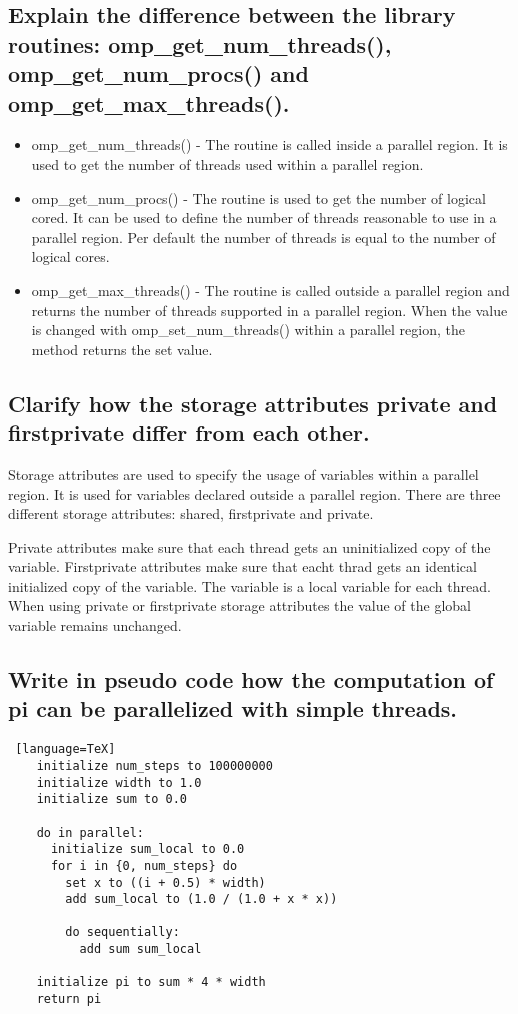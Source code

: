 \documentclass[runningheads]{llncs}
\begin{document}
\subsection{Explain the difference between the library routines: omp\_get\_num\_threads(), omp\_get\_num\_procs() and omp\_get\_max\_threads().}
\begin{itemize}
	\item omp\_get\_num\_threads() - 
	The routine is called inside a parallel region. It is used to get the number of threads used within a parallel region.
	\item omp\_get\_num\_procs() - 
	The routine is used to get the number of logical cored. It can be used to define the number of threads reasonable to use 
	in a parallel region. Per default the number of threads is equal to the number of logical cores.
	\item omp\_get\_max\_threads() - 
	The routine is called outside a parallel region and returns the number of threads supported in a parallel region. 
	When the value is changed with omp\_set\_num\_threads() within a parallel region, the method returns the set value.
\end{itemize}

\subsection{Clarify how the storage attributes private and firstprivate differ from each other.}
Storage attributes are used to specify the usage of variables within a parallel region. 
It is used for variables declared outside a parallel region.
There are three different storage attributes: shared, firstprivate and private.

Private attributes make sure that each thread gets an uninitialized copy of the variable.
Firstprivate attributes make sure that eacht thrad gets an identical initialized copy of the variable. 
The variable is a local variable for each thread.
When using private or firstprivate storage attributes the value of the global variable remains unchanged.

\subsection{Write in pseudo code how the computation of pi can be parallelized with simple threads.}
\begin{lstlisting} [language=TeX]
	initialize num_steps to 100000000
	initialize width to 1.0
	initialize sum to 0.0

	do in parallel:
	  initialize sum_local to 0.0
	  for i in {0, num_steps} do
	    set x to ((i + 0.5) * width)
		add sum_local to (1.0 / (1.0 + x * x))
		
		do sequentially:
		  add sum sum_local
	
	initialize pi to sum * 4 * width
	return pi


\end{lstlisting}
\end{document}
